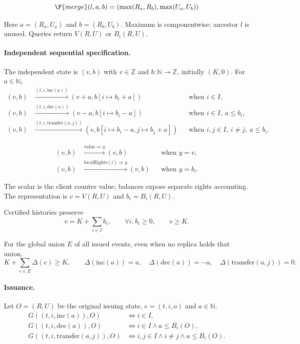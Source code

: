\[
\F{merge}(l,a,b)=(\max(R_a,R_b),\max(U_a,U_b))
\]

Here $a=(R_a,U_a)$ and $b=(R_b,U_b)$. Maximum is componentwise;
ancestor $l$ is unused. Queries return $V(R,U)$ or $B_i(R,U)$.

\paragraph{Independent sequential specification.}
The independent state is $(v,b)$ with $v\in\mathbb Z$ and $b:\mathbb N\to\mathbb Z$, initially $(K,0)$. For $a\in\mathbb N$,
\[
\begin{aligned}
(v,b)&\xrightarrow{(t,i,\mathrm{inc}(a))}(v+a,b[i\mapsto b_i+a])&&\text{when }i\in I,\\
(v,b)&\xrightarrow{(t,i,\mathrm{dec}(a))}(v-a,b[i\mapsto b_i-a])&&\text{when }i\in I,\ a\le b_i,\\
(v,b)&\xrightarrow{(t,i,\mathrm{transfer}(a,j))}(v,b[i\mapsto b_i-a,j\mapsto b_j+a])&&\text{when }i,j\in I,\ i\ne j,\ a\le b_i.
\end{aligned}
\]

\[
\begin{aligned}
(v,b)&\xrightarrow{\mathrm{value}\Rightarrow y}(v,b)&&\text{when }y=v,\\
(v,b)&\xrightarrow{\mathrm{localRights}(i)\Rightarrow y}(v,b)&&\text{when }y=b_i.
\end{aligned}
\]

The scalar is the client counter value; balances expose separate rights accounting. The representation is $v=V(R,U)$ and $b_i=B_i(R,U)$.

Certified histories preserve
\[
v=K+\sum_{i\in I}b_i,\qquad\forall i.\ b_i\ge0,\qquad v\ge K.
\]

For the global union $E$ of all issued events, even when no replica holds that union,
\[
K+\sum_{e\in E}\Delta(e)\ge K,\qquad\Delta(\mathrm{inc}(a))=a,\quad\Delta(\mathrm{dec}(a))=-a,\quad\Delta(\mathrm{transfer}(a,j))=0.
\]

\paragraph{Issuance.}
Let $O=(R,U)$ be the original issuing state, $e=(t,i,o)$ and $a\in\mathbb N$.
\[
\begin{aligned}
G((t,i,\mathrm{inc}(a)),O)&\iff i\in I,\\
G((t,i,\mathrm{dec}(a)),O)&\iff i\in I\land a\le B_i(O),\\
G((t,i,\mathrm{transfer}(a,j)),O)&\iff i,j\in I\land i\ne j\land a\le B_i(O).
\end{aligned}
\]


